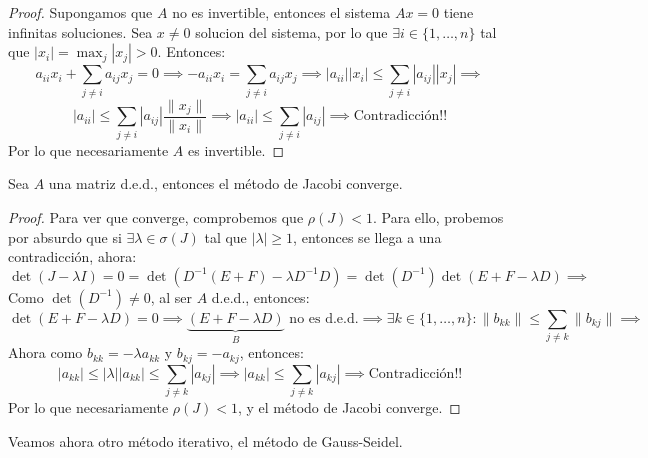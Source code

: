 \begin{proof}
    Supongamos que $A$ no es invertible, entonces el sistema $Ax = 0$ tiene infinitas soluciones. Sea $x \neq 0$ solucion del sistema, por lo que $\exists i \in \{1, \dots, n\}$ tal que $|x_i| = \max_{j} |x_j| > 0$. Entonces:
    \[
        a_{ii} x_i + \sum_{j \neq i} a_{ij} x_j = 0 \implies
        - a_{ii} x_i = \sum_{j \neq i} a_{ij} x_j \implies
        |a_{ii}| |x_i| \leq \sum_{j \neq i} |a_{ij}| |x_j| \implies
    \]
    \[
        |a_{ii}| \leq \sum_{j \neq i} |a_{ij}| \frac{ \| x_j \| }{ \| x_i \| } \implies
        |a_{ii}| \leq \sum_{j \neq i} |a_{ij}| \implies
        \text{Contradicción!!}
    \]
    Por lo que necesariamente $A$ es invertible.
\end{proof}

\begin{teorema}
    Sea $A$ una matriz d.e.d., entonces el método de Jacobi converge.
\end{teorema}

\begin{proof}
    Para ver que converge, comprobemos que $\rho(J) < 1$. Para ello, probemos por absurdo que si $\exists \lambda \in \sigma(J)$ tal que $|\lambda| \geq 1$, entonces se llega a una contradicción, ahora:
    \[
        \det(J - \lambda I) = 
        0 = 
        \det(D^{-1}(E + F) - \lambda D^{-1}D) =
        \det(D^{-1}) \det(E + F - \lambda D) \implies 
    \]
    Como $\det(D^{-1}) \neq 0$, al ser $A$ d.e.d., entonces:
    \[
        \det(E + F - \lambda D) = 0 \implies
        \underbrace{(E + F - \lambda D)}_{B} \text{ no es d.e.d.} \implies
        \exists k \in \{1, \dots, n\} : \| b_{kk} \| \leq \sum_{j \neq k} \| b_{kj} \| \implies
    \]
    Ahora como $b_{kk} = -\lambda a_{kk}$ y $b_{kj} = - a_{kj}$, entonces:
    \[
        |a_{kk}| \leq |\lambda| |a_{kk}| \leq \sum_{j \neq k} |a_{kj}| \implies
        |a_{kk}| \leq \sum_{j \neq k} |a_{kj}| \implies
        \text{Contradicción!!}
    \]
    Por lo que necesariamente $\rho(J) < 1$, y el método de Jacobi converge.
\end{proof}

Veamos ahora otro método iterativo, el método de Gauss-Seidel.

